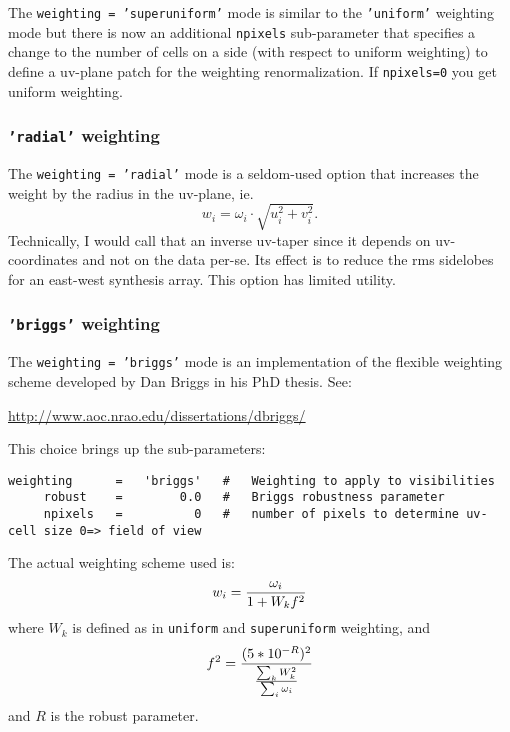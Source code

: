 The {\tt weighting = 'superuniform'} mode is similar to the
{\tt 'uniform'} weighting mode but there is now an additional
{\tt npixels} sub-parameter that specifies a change to the number of 
cells on a side (with respect to uniform weighting) to define a
uv-plane patch for the weighting renormalization.  
If {\tt npixels=0} you get uniform weighting.

\subsubsection{{\tt 'radial'} weighting }
\label{section:im.pars.weighting.radial}

The {\tt weighting = 'radial'} mode is a seldom-used option that
increases the weight by the radius in the uv-plane, ie.
\begin{equation}
  w_i = \omega_i \cdot \sqrt{u^2_i + v^2_i}.
\end{equation}
Technically, I would call that an inverse uv-taper since it depends on
uv-coordinates and not on the data per-se.
Its effect is to reduce the rms sidelobes for an east-west synthesis
array.  This option has limited utility.

\subsubsection{{\tt 'briggs'} weighting }
\label{section:im.pars.weighting.briggs}

The {\tt weighting = 'briggs'} mode is an implementation of the
flexible weighting scheme developed by Dan Briggs in his PhD thesis.
See:

\url{http://www.aoc.nrao.edu/dissertations/dbriggs/}

This choice brings up the sub-parameters:
\small
\begin{verbatim}
weighting      =   'briggs'   #   Weighting to apply to visibilities 
     robust    =        0.0   #   Briggs robustness parameter
     npixels   =          0   #   number of pixels to determine uv-cell size 0=> field of view
\end{verbatim}
\normalsize

The actual weighting scheme used is:
\begin{equation}
   w_i={\omega_i\over{1 + W_k f^2}}
\end{equation}
where $W_k$ is defined as in {\tt uniform} and {\tt superuniform}
weighting, and
\begin{equation}
   f^2={{(5*10^{-R})^2}\over{{\sum_k W_k^2}\over{\sum_i \omega_i}}}
\end{equation}
and $R$ is the robust parameter. 

